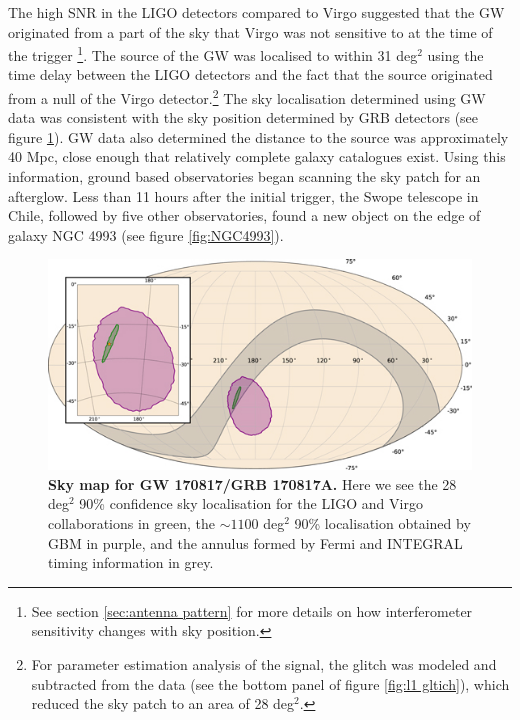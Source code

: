 \documentclass[11pt]{cuthesis}
\begin{document}
The high SNR in the LIGO detectors compared to Virgo suggested that the GW originated from a part of the sky that Virgo was not sensitive to at the time of the trigger \footnote{See section \ref{sec:antenna pattern} for more details on how interferometer sensitivity changes with sky position.}. The source of the GW was localised to within 31 deg$^2$ using the time delay between the LIGO detectors and the fact that the source originated from a null of the Virgo detector.\footnote{For parameter estimation analysis of the signal, the glitch was modeled and subtracted from the data (see the bottom panel of figure \ref{fig:l1 gltich}), which reduced the sky patch to an area of 28 deg$^2$.} \cite{GW170817_det} The sky localisation determined using GW data was consistent with the sky position determined by GRB detectors (see figure \ref{fig:170817 skymap}). GW data also determined the distance to the source was approximately 40 Mpc, close enough that relatively complete galaxy catalogues exist. Using this information, ground based observatories began scanning the sky patch for an afterglow. Less than 11 hours after the initial trigger, the Swope telescope in Chile, followed by five other observatories, \cite{grb170817a_mm} found a new object on the edge of galaxy NGC 4993 (see figure \ref{fig:NGC4993}). 


\begin{figure} %
\begin{center}
\includegraphics[width=0.8\linewidth]{gw-grb-170817-sky-map.jpg}
\end{center}
\caption{\textbf{Sky map for GW 170817/GRB 170817A.} Here we see the 28 deg$^2$ 90\% confidence sky localisation for the LIGO and Virgo collaborations in green, the $\sim1100$ deg$^2$ \cite{grb170817a_mm} 90\% localisation obtained by GBM in purple, and the annulus formed by Fermi and INTEGRAL timing information in grey.  \cite{GW170817_GRB} }
\label{fig:170817 skymap}
\end{figure}
\end{document}
